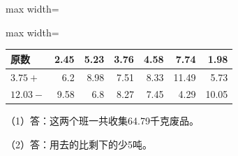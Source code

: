 
\begingroup\color{answerred}\noindent\begin{adjustbox}{max width=\linewidth}\begin{adjustbox}{max width=\linewidth}\begin{tabular}{lrrrrrr}\toprule
原数&2.45&5.23&3.76&4.58&7.74&1.98\\\midrule
$3.75+$&6.2&8.98&7.51&8.33&11.49&5.73\\
$12.03-$&9.58&6.8&8.27&7.45&4.29&10.05\\\bottomrule\end{tabular}\end{adjustbox}\end{adjustbox}\par\endgroup
{}
\begingroup\color{answerred}\par\endgroup
{}
\begingroup\color{answerred}\noindent（1）答：这两个班一共收集64.79千克废品。\par
\noindent（2）答：用去的比剩下的少5吨。\par\par\endgroup
